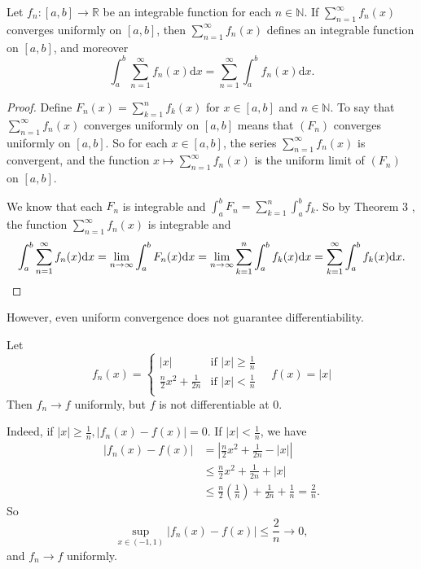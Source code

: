 \documentclass[a4paper,11pt]{article}
\begin{document}
\begin{corollary}\label{col:4}
    Let $f_{n}:[a, b] \rightarrow \mathbb{R}$ be an integrable function for each $n \in \mathbb{N}$. If $\sum_{n=1}^{\infty} f_{n}(x)$ converges uniformly on $[a, b]$, then $\sum_{n=1}^{\infty} f_{n}(x)$ defines an integrable function on $[a, b]$, and moreover
    \[
    \int_{a}^{b} \sum_{n=1}^{\infty} f_{n}(x) \mathrm{d} x=\sum_{n=1}^{\infty} \int_{a}^{b} f_{n}(x) \mathrm{d} x.
    \]
\end{corollary}
\begin{proof}
    Define $F_{n}(x)=\sum_{k=1}^{n} f_{k}(x)$ for $x \in[a, b]$ and $n \in \mathbb{N}$. To say that $\sum_{n=1}^{\infty} f_{n}(x)$ converges uniformly on $[a, b]$ means that $\left(F_{n}\right)$ converges uniformly on $[a, b]$. So for each $x \in[a, b]$, the series $\sum_{n=1}^{\infty} f_{n}(x)$ is convergent, and the function $x \mapsto \sum_{n=1}^{\infty} f_{n}(x)$ is the uniform limit of $\left(F_{n}\right)$ on $[a, b]$.

    We know that each $F_{n}$ is integrable and $\int_{a}^{b} F_{n}=\sum_{k=1}^{n} \int_{a}^{b} f_{k}$. So by Theorem 3 , the function $\sum_{n=1}^{\infty} f_{n}(x)$ is integrable and
    \[
    \int_{a}^{b} \sum_{n=1}^{\infty} f_{n}(x) \mathrm{d} x=\lim _{n \rightarrow \infty} \int_{a}^{b} F_{n}(x) \mathrm{d} x=\lim _{n \rightarrow \infty} \sum_{k=1}^{n} \int_{a}^{b} f_{k}(x) \mathrm{d} x=\sum_{k=1}^{\infty} \int_{a}^{b} f_{k}(x) \mathrm{d} x.\qedhere
    \]
\end{proof}

However, even uniform convergence does not guarantee differentiability. 
\begin{example}
    Let 
    \[
        f_n(x) = \begin{cases}
        |x| &\text{if }|x|\ge \frac{1}{n}\\
        \frac{n}{2}x^2+\frac{1}{2n} &\text{if }|x|<\frac{1}{n}\\
        \end{cases} \quad f(x) = |x|
    \]
    Then $ f_n\to f $ uniformly, but $f$ is not differentiable at $0$. 

    Indeed, if $ |x|\ge \frac{1}{n}, |f_n(x)-f(x)|=0 $. If $ |x|<\frac{1}{n} $, we have 
    \begin{align*}
        |f_n(x)-f(x)| &= \left| \frac{n}{2}x^2+\frac{1}{2n}-|x| \right| \\ 
        &\le \frac{n}{2}x^2+\frac{1}{2n} +|x| \\ 
        &\le \frac{n}{2}\left( \frac{1}{n} \right) +\frac{1}{2n}+\frac{1}{n}
        =\frac{2}{n}. 
    \end{align*}
    So 
    \[
        \sup_{x\in (-1,1)}|f_n(x)-f(x)| \le \frac{2}{n}\to 0, 
    \]
    and $f_n\to f$ uniformly. 
\end{example}
\end{document}
